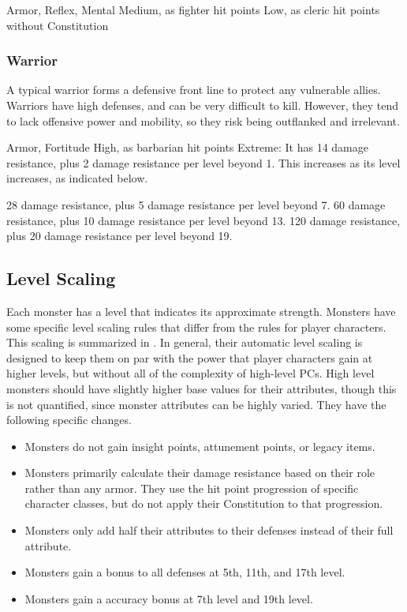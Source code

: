         Armor,  Reflex,  Mental
       Medium, as fighter hit points
       Low, as cleric hit points without Constitution

    \subsubsection{Warrior}
      A typical warrior forms a defensive front line to protect any vulnerable allies.
      Warriors have high defenses, and can be very difficult to kill.
      However, they tend to lack offensive power and mobility, so they risk being outflanked and irrelevant.

        Armor,  Fortitude
       High, as barbarian hit points
       Extreme: It has 14 damage resistance, plus 2 damage resistance per level beyond 1.
      This increases as its level increases, as indicated below.
      \begin{itemize}
         28 damage resistance, plus 5 damage resistance per level beyond 7.
         60 damage resistance, plus 10 damage resistance per level beyond 13.
         120 damage resistance, plus 20 damage resistance per level beyond 19.
      \end{itemize}

  \subsection{Level Scaling}
    Each monster has a level that indicates its approximate strength.
    Monsters have some specific level scaling rules that differ from the rules for player characters.
    This scaling is summarized in .
    In general, their automatic level scaling is designed to keep them on par with the power that player characters gain at higher levels, but without all of the complexity of high-level PCs.
    High level monsters should have slightly higher base values for their attributes, though this is not quantified, since monster attributes can be highly varied.
    They have the following specific changes.
    \begin{itemize}
      \item Monsters do not gain insight points, attunement points, or legacy items.
      \item Monsters primarily calculate their damage resistance based on their role rather than any armor.
        They use the hit point progression of specific character classes, but do not apply their Constitution to that progression.
      \item Monsters only add half their attributes to their defenses instead of their full attribute.
      \item Monsters gain a  bonus to all defenses at 5th, 11th, and 17th level.
      \item Monsters gain a  accuracy bonus at 7th level and 19th level.
    \end{itemize}


